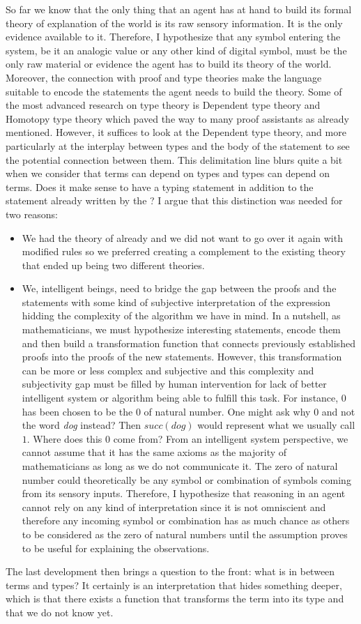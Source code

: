 So far we know that the only thing that an agent has at hand to build its formal theory of explanation of the world is its raw sensory information. It is the only evidence available to it. Therefore, I hypothesize that any symbol entering the system, be it an analogic value or any other kind of digital symbol, must be the only raw material or evidence the agent has to build its theory of the world. Moreover, the connection with proof and type theories make the \lambdacalc language suitable to encode the statements the agent needs to build the theory. Some of the most advanced research on type theory is Dependent type theory and Homotopy type theory which paved the way to many proof assistants as already mentioned. However, it suffices to look at the Dependent type theory, and more particularly at the interplay between types and the body of the statement to see the potential connection between them. This delimitation line blurs quite a bit when we consider that terms can depend on types and types can depend on terms. Does it make sense to have a typing statement in addition to the statement already written by the \lambdaexpr?
I argue that this distinction was needed for two reasons:
\begin{itemize}
    \item We had the theory of \lambdacalc already and we did not want to go over it again with modified rules so we preferred creating a complement to the existing theory that ended up being two different theories.
    \item We, intelligent beings, need to bridge the gap between the proofs and the statements with some kind of subjective interpretation of the expression hidding the complexity of the algorithm we have in mind. In a nutshell, as mathematicians, we must hypothesize interesting statements, encode them and then build a transformation function that connects previously established proofs into the proofs of the new statements. However, this transformation can be more or less complex and subjective and this complexity and subjectivity gap must be filled by human intervention for lack of better intelligent system or algorithm being able to fulfill this task. For instance, $0$ has been chosen to be the $0$ of natural number. One might ask why $0$ and not the word \textit{dog} instead? Then $succ(dog)$ would represent what we usually call $1$. Where does this $0$ come from? From an intelligent system perspective, we cannot assume that it has the same axioms as the majority of mathematicians as long as we do not communicate it. The zero of natural number could theoretically be any symbol or combination of symbols coming from its sensory inputs. Therefore, I hypothesize that reasoning in an agent cannot rely on any kind of interpretation since it is not omniscient and therefore any incoming symbol or combination has as much chance as others to be considered as the zero of natural numbers until the assumption proves to be useful for explaining the observations.
\end{itemize} 
The last development then brings a question to the front: what is in between terms and types? It certainly is an interpretation that hides something deeper, which is that there exists a function that transforms the term into its type and that we do not know yet.


